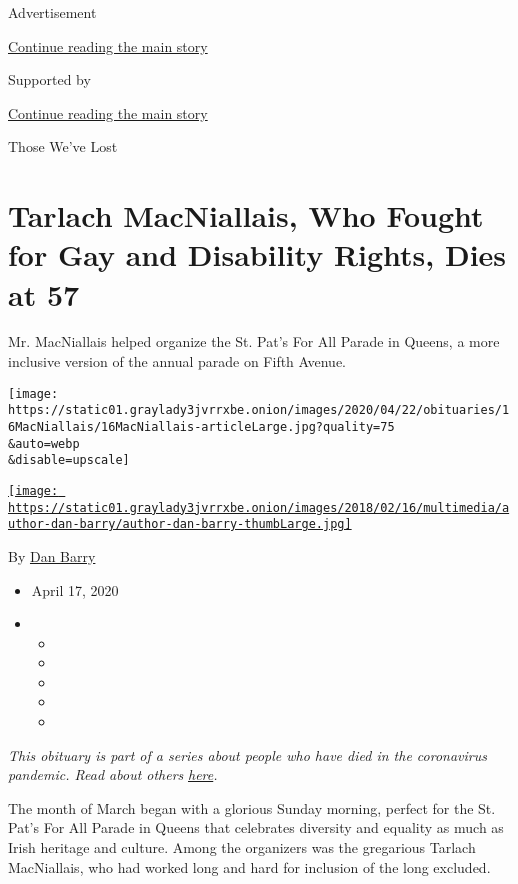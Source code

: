 Advertisement

\protect\hyperlink{after-top}{Continue reading the main story}

Supported by

\protect\hyperlink{after-sponsor}{Continue reading the main story}

Those We've Lost

\hypertarget{tarlach-macniallais-who-fought-for-gay-and-disability-rights-dies-at-57}{%
\section{Tarlach MacNiallais, Who Fought for Gay and Disability Rights,
Dies at
57}\label{tarlach-macniallais-who-fought-for-gay-and-disability-rights-dies-at-57}}

Mr. MacNiallais helped organize the St. Pat's For All Parade in Queens,
a more inclusive version of the annual parade on Fifth Avenue.

\texttt{[image: https://static01.graylady3jvrrxbe.onion/images/2020/04/22/obituaries/16MacNiallais/16MacNiallais-articleLarge.jpg?quality=75\\\&auto=webp\\\&disable=upscale]}

\href{https://www.nytimes3xbfgragh.onion/by/dan-barry}{\texttt{[image: https://static01.graylady3jvrrxbe.onion/images/2018/02/16/multimedia/author-dan-barry/author-dan-barry-thumbLarge.jpg]}}

By \href{https://www.nytimes3xbfgragh.onion/by/dan-barry}{Dan Barry}

\begin{itemize}
\item
  April 17, 2020
\item
  \begin{itemize}
  \item
  \item
  \item
  \item
  \item
  \end{itemize}
\end{itemize}

\emph{This obituary is part of a series about people who have died in
the coronavirus pandemic. Read about others}
\href{https://www.nytimes3xbfgragh.onion/series/people-who-have-died-of-the-coronavirus}{\emph{here}}\emph{.}

The month of March began with a glorious Sunday morning, perfect for the
St. Pat's For All Parade in Queens that celebrates diversity and
equality as much as Irish heritage and culture. Among the organizers was
the gregarious Tarlach MacNiallais, who had worked long and hard for
inclusion of the long excluded.

